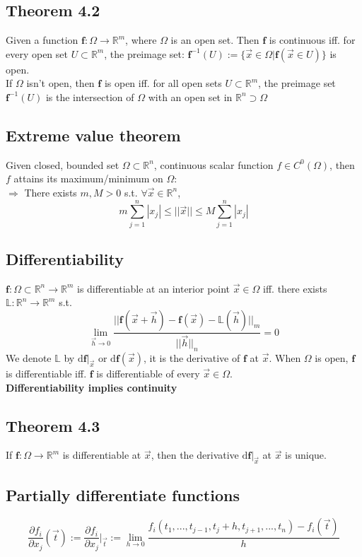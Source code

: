 \documentclass[11pt, a4paper]{article}
\begin{document}
    \subsection{Theorem 4.2}
    Given a function $\bm{f}: \Omega \to \mathbb{R}^m$, where $\Omega$ is an open set. Then $\bm{f}$ is continuous iff. for every open set $U \subset \mathbb{R}^m$, the preimage set: $\bm{f}^{-1}(U) := \{\vec{x} \in \Omega | \bm{f}(\vec{x} \in U)\}$ is open. \\
    If $\Omega$ isn't open, then $\bm{f}$ is open iff. for all open sets $U \subset \mathbb{R}^m$, the preimage set $\bm{f}^{-1}(U)$ is the intersection of $\Omega$ with an open set in $\mathbb{R}^n \supset \Omega$
    \subsection{Extreme value theorem}
    Given closed, bounded set $\Omega \subset \mathbb{R}^n$, continuous scalar function $f \in C^0(\Omega)$, then $f$ attains its maximum/minimum on $\Omega$: \\
    $\Rightarrow$ There exists $m, M > 0$ s.t. $\forall \vec{x} \in \mathbb{R}^n$,
    $$m\sum\limits_{j = 1}^n|x_j| \leq ||\vec{x}|| \leq M\sum\limits_{j = 1}^n|x_j|$$
    \subsection{Differentiability}
    $\bm{f}: \Omega \subset \mathbb{R}^n \to \mathbb{R}^m$ is differentiable at an interior point $\vec{x} \in \Omega$ iff. there exists $\mathbb{L}: \mathbb{R}^n \to \mathbb{R}^m$ s.t.
    $$\lim\limits_{\vec{h} \to 0} \frac{||\bm{f}(\vec{x} + \vec{h}) - \bm{f}(\vec{x}) - \mathbb{L}(\vec{h})||_m}{||\vec{h}||_n} = 0$$
   We denote $\mathbb{L}$ by $\mathrm{d}\bm{f}|_{\vec{x}}$ or $\mathrm{d}\bm{f}(\vec{x})$, it is the derivative of $\bm{f}$ at $\vec{x}$. When $\Omega$ is open, $\bm{f}$ is differentiable iff. $\bm{f}$ is differentiable of every $\vec{x} \in \Omega$. \\
   \textbf{Differentiability implies continuity}
   \subsection{Theorem 4.3} 
   If $\bm{f}: \Omega \to \mathbb{R}^m$ is differentiable at $\vec{x}$, then the derivative $\mathrm{d}\bm{f}|_{\vec{x}}$ at $\vec{x}$ is unique.
   \subsection{Partially differentiate functions}
   $$\frac{\partial f_i}{\partial x_j}(\vec{t}) := \frac{\partial f_i}{\partial x_j}|_{\vec{t}} := \lim\limits_{h \to 0}\frac{f_i(t_1, ..., t_{j - 1}, t_j + h, t_{j + 1}, ..., t_n) - f_i(\vec{t})}{h}$$
\end{document}
